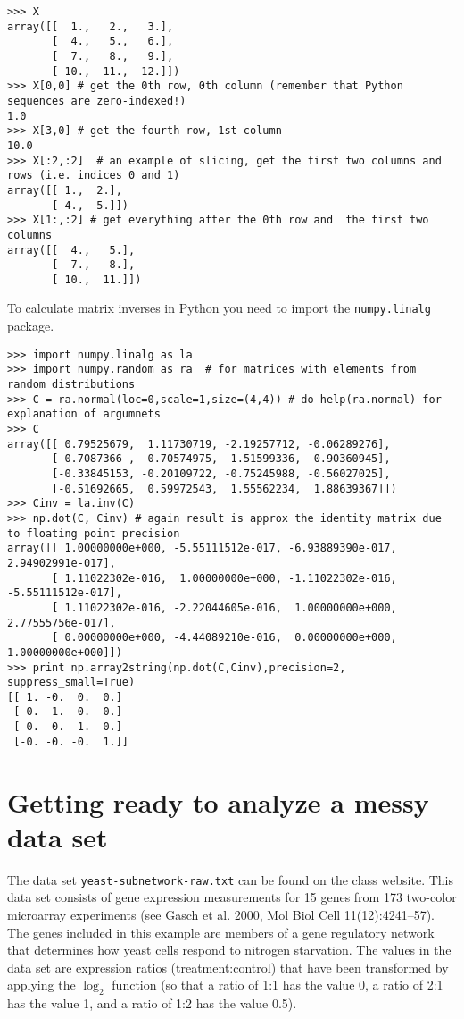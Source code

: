 \documentclass{article}
\begin{document}
\begin{lstlisting}
>>> X
array([[  1.,   2.,   3.],
       [  4.,   5.,   6.],
       [  7.,   8.,   9.],
       [ 10.,  11.,  12.]])
>>> X[0,0] # get the 0th row, 0th column (remember that Python sequences are zero-indexed!)
1.0
>>> X[3,0] # get the fourth row, 1st column
10.0
>>> X[:2,:2]  # an example of slicing, get the first two columns and rows (i.e. indices 0 and 1)
array([[ 1.,  2.],
       [ 4.,  5.]])
>>> X[1:,:2] # get everything after the 0th row and  the first two columns
array([[  4.,   5.],
       [  7.,   8.],
       [ 10.,  11.]])
\end{lstlisting}
To calculate matrix inverses in Python you need to import the
\lstinline!numpy.linalg! package.

\begin{lstlisting}
>>> import numpy.linalg as la
>>> import numpy.random as ra  # for matrices with elements from random distributions
>>> C = ra.normal(loc=0,scale=1,size=(4,4)) # do help(ra.normal) for explanation of argumnets
>>> C
array([[ 0.79525679,  1.11730719, -2.19257712, -0.06289276],
       [ 0.7087366 ,  0.70574975, -1.51599336, -0.90360945],
       [-0.33845153, -0.20109722, -0.75245988, -0.56027025],
       [-0.51692665,  0.59972543,  1.55562234,  1.88639367]])
>>> Cinv = la.inv(C)
>>> np.dot(C, Cinv) # again result is approx the identity matrix due to floating point precision
array([[ 1.00000000e+000, -5.55111512e-017, -6.93889390e-017,  2.94902991e-017],
       [ 1.11022302e-016,  1.00000000e+000, -1.11022302e-016, -5.55111512e-017],
       [ 1.11022302e-016, -2.22044605e-016,  1.00000000e+000,  2.77555756e-017],
       [ 0.00000000e+000, -4.44089210e-016,  0.00000000e+000,  1.00000000e+000]])
>>> print np.array2string(np.dot(C,Cinv),precision=2, suppress_small=True)
[[ 1. -0.  0.  0.]
 [-0.  1.  0.  0.]
 [ 0.  0.  1.  0.]
 [-0. -0. -0.  1.]]
\end{lstlisting}
\section{Getting ready to analyze a messy data set}

The data set \lstinline!yeast-subnetwork-raw.txt! can be found on the
class website. This data set consists of gene expression measurements
for 15 genes from 173 two-color microarray experiments (see Gasch et al.
2000, Mol Biol Cell 11(12):4241--57). The genes included in this example
are members of a gene regulatory network that determines how yeast cells
respond to nitrogen starvation. The values in the data set are
expression ratios (treatment:control) that have been transformed by
applying the $\log_2$ function (so that a ratio of 1:1 has the value 0,
a ratio of 2:1 has the value 1, and a ratio of 1:2 has the value 0.5).
\end{document}
